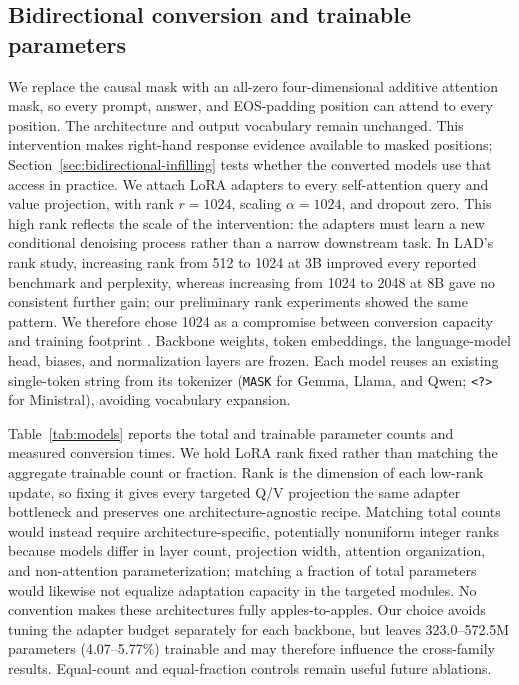 \documentclass{article}
\begin{document}
\subsection{Bidirectional conversion and trainable parameters}

We replace the causal mask with an all-zero four-dimensional additive attention mask, so every prompt, answer, and EOS-padding position can attend to every position. The architecture and output vocabulary remain unchanged. This intervention makes right-hand response evidence available to masked positions; Section~\ref{sec:bidirectional-infilling} tests whether the converted models use that access in practice. We attach LoRA adapters to every self-attention query and value projection, with rank $r=1024$, scaling $\alpha=1024$, and dropout zero. This high rank reflects the scale of the intervention: the adapters must learn a new conditional denoising process rather than a narrow downstream task. In LAD's rank study, increasing rank from 512 to 1024 at 3B improved every reported benchmark and perplexity, whereas increasing from 1024 to 2048 at 8B gave no consistent further gain; our preliminary rank experiments showed the same pattern. We therefore chose 1024 as a compromise between conversion capacity and training footprint \citep{kuiper2025lad}. Backbone weights, token embeddings, the language-model head, biases, and normalization layers are frozen. Each model reuses an existing single-token string from its tokenizer (\texttt{MASK} for Gemma, Llama, and Qwen; \texttt{<?>} for Ministral), avoiding vocabulary expansion.

Table~\ref{tab:models} reports the total and trainable parameter counts and measured conversion times. We hold LoRA rank fixed rather than matching the aggregate trainable count or fraction. Rank is the dimension of each low-rank update, so fixing it gives every targeted Q/V projection the same adapter bottleneck and preserves one architecture-agnostic recipe. Matching total counts would instead require architecture-specific, potentially nonuniform integer ranks because models differ in layer count, projection width, attention organization, and non-attention parameterization; matching a fraction of total parameters would likewise not equalize adaptation capacity in the targeted modules. No convention makes these architectures fully apples-to-apples. Our choice avoids tuning the adapter budget separately for each backbone, but leaves 323.0--572.5M parameters (4.07--5.77\%) trainable and may therefore influence the cross-family results. Equal-count and equal-fraction controls remain useful future ablations.
\end{document}
